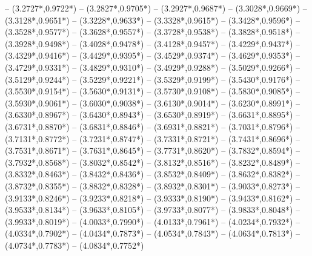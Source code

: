 {	-- ({3.2727*\dx},{0.9722*\dy})
	-- ({3.2827*\dx},{0.9705*\dy})
	-- ({3.2927*\dx},{0.9687*\dy})
	-- ({3.3028*\dx},{0.9669*\dy})
	-- ({3.3128*\dx},{0.9651*\dy})
	-- ({3.3228*\dx},{0.9633*\dy})
	-- ({3.3328*\dx},{0.9615*\dy})
	-- ({3.3428*\dx},{0.9596*\dy})
	-- ({3.3528*\dx},{0.9577*\dy})
	-- ({3.3628*\dx},{0.9557*\dy})
	-- ({3.3728*\dx},{0.9538*\dy})
	-- ({3.3828*\dx},{0.9518*\dy})
	-- ({3.3928*\dx},{0.9498*\dy})
	-- ({3.4028*\dx},{0.9478*\dy})
	-- ({3.4128*\dx},{0.9457*\dy})
	-- ({3.4229*\dx},{0.9437*\dy})
	-- ({3.4329*\dx},{0.9416*\dy})
	-- ({3.4429*\dx},{0.9395*\dy})
	-- ({3.4529*\dx},{0.9374*\dy})
	-- ({3.4629*\dx},{0.9353*\dy})
	-- ({3.4729*\dx},{0.9331*\dy})
	-- ({3.4829*\dx},{0.9310*\dy})
	-- ({3.4929*\dx},{0.9288*\dy})
	-- ({3.5029*\dx},{0.9266*\dy})
	-- ({3.5129*\dx},{0.9244*\dy})
	-- ({3.5229*\dx},{0.9221*\dy})
	-- ({3.5329*\dx},{0.9199*\dy})
	-- ({3.5430*\dx},{0.9176*\dy})
	-- ({3.5530*\dx},{0.9154*\dy})
	-- ({3.5630*\dx},{0.9131*\dy})
	-- ({3.5730*\dx},{0.9108*\dy})
	-- ({3.5830*\dx},{0.9085*\dy})
	-- ({3.5930*\dx},{0.9061*\dy})
	-- ({3.6030*\dx},{0.9038*\dy})
	-- ({3.6130*\dx},{0.9014*\dy})
	-- ({3.6230*\dx},{0.8991*\dy})
	-- ({3.6330*\dx},{0.8967*\dy})
	-- ({3.6430*\dx},{0.8943*\dy})
	-- ({3.6530*\dx},{0.8919*\dy})
	-- ({3.6631*\dx},{0.8895*\dy})
	-- ({3.6731*\dx},{0.8870*\dy})
	-- ({3.6831*\dx},{0.8846*\dy})
	-- ({3.6931*\dx},{0.8821*\dy})
	-- ({3.7031*\dx},{0.8796*\dy})
	-- ({3.7131*\dx},{0.8772*\dy})
	-- ({3.7231*\dx},{0.8747*\dy})
	-- ({3.7331*\dx},{0.8721*\dy})
	-- ({3.7431*\dx},{0.8696*\dy})
	-- ({3.7531*\dx},{0.8671*\dy})
	-- ({3.7631*\dx},{0.8645*\dy})
	-- ({3.7731*\dx},{0.8620*\dy})
	-- ({3.7832*\dx},{0.8594*\dy})
	-- ({3.7932*\dx},{0.8568*\dy})
	-- ({3.8032*\dx},{0.8542*\dy})
	-- ({3.8132*\dx},{0.8516*\dy})
	-- ({3.8232*\dx},{0.8489*\dy})
	-- ({3.8332*\dx},{0.8463*\dy})
	-- ({3.8432*\dx},{0.8436*\dy})
	-- ({3.8532*\dx},{0.8409*\dy})
	-- ({3.8632*\dx},{0.8382*\dy})
	-- ({3.8732*\dx},{0.8355*\dy})
	-- ({3.8832*\dx},{0.8328*\dy})
	-- ({3.8932*\dx},{0.8301*\dy})
	-- ({3.9033*\dx},{0.8273*\dy})
	-- ({3.9133*\dx},{0.8246*\dy})
	-- ({3.9233*\dx},{0.8218*\dy})
	-- ({3.9333*\dx},{0.8190*\dy})
	-- ({3.9433*\dx},{0.8162*\dy})
	-- ({3.9533*\dx},{0.8134*\dy})
	-- ({3.9633*\dx},{0.8105*\dy})
	-- ({3.9733*\dx},{0.8077*\dy})
	-- ({3.9833*\dx},{0.8048*\dy})
	-- ({3.9933*\dx},{0.8019*\dy})
	-- ({4.0033*\dx},{0.7990*\dy})
	-- ({4.0133*\dx},{0.7961*\dy})
	-- ({4.0234*\dx},{0.7932*\dy})
	-- ({4.0334*\dx},{0.7902*\dy})
	-- ({4.0434*\dx},{0.7873*\dy})
	-- ({4.0534*\dx},{0.7843*\dy})
	-- ({4.0634*\dx},{0.7813*\dy})
	-- ({4.0734*\dx},{0.7783*\dy})
	-- ({4.0834*\dx},{0.7752*\dy})
}
